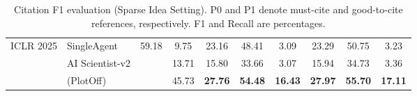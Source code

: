 \begin{table}[tbp]
{\begin{tabular}{ll c c ccc ccc}
        \midrule
        \multirow{3}{*}{ICLR 2025} 
        & SingleAgent      & \multirow{3}{*}{59.18} & 9.75 & 23.16 & 48.41 & 3.09 & 23.29 & 50.75 & 3.23 \\
        & AI Scientist-v2  & & 13.71 & 15.80 & 33.66 & 3.07 & 15.94 & 34.73 & 3.36  \\
        & \ourmethod{} (PlotOff)     & & \cellcolor{best_color}45.73 & \cellcolor{best_color}\textbf{27.76} & \cellcolor{best_color}\textbf{54.48} & \cellcolor{best_color}\textbf{16.43} & \cellcolor{best_color}\textbf{27.97} & \cellcolor{best_color}\textbf{55.70} & \cellcolor{best_color}\textbf{17.11} \\
        \bottomrule
    \end{tabular}%
    } %
    \caption{Citation F1 evaluation (Sparse Idea Setting). P0 and P1 denote must-cite and good-to-cite references, respectively. F1 and Recall are percentages.}
    \label{tab:citation_f1}
\end{table}
